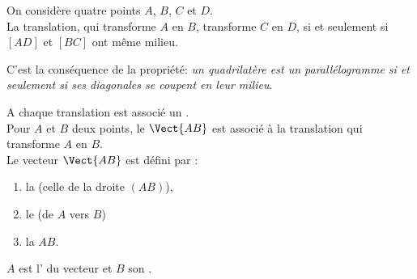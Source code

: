 \documentclass{book}
\begin{document}
\begin{Proposition}
 On considère quatre points $A$,   $B$, $C$ et $D$. \\
La translation, qui transforme $A$ en $B$, transforme $C$ en $D$, si et seulement si   $[ AD ]$ et $[ BC ]$ ont même milieu.
\begin{center}
\end{center}
\end{Proposition}
\begin{Demonstration}
C'est la conséquence de la propriété: \textit{un quadrilatère est un parallélogramme si et seulement si ses diagonales se coupent en leur milieu}\fg.
\end{Demonstration}


\begin{Definition}
A chaque translation est associé un . \\
Pour $A$ et $B$ deux points, le  $\Vect{AB}$ est associé à la translation qui transforme $A$ en $B$. \\
Le vecteur $\Vect{AB}$ est défini par :
\begin{enumerate}
\item la  (celle de la droite $(AB)$), 
\item le  (de $A$ vers $B$)
\item la  $AB$. 
\end{enumerate}
$A$ est l' du vecteur et $B$ son .
\end{Definition}
\end{document}
